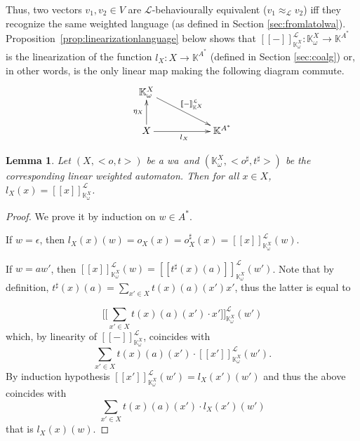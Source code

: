 \documentclass[3p]{elsarticle}
\newcommand{\fL}{\mathcal{L}}    %
\newcommand{\beh}[3]{\left[\!\left[ #1 \right]\!\right]^{#2}_{#3}} %
\newcommand{\Beh}[3]{\Big[\!\!\Big[ #1 \Big]\!\!\Big ]^{#2}_{#3}} %
\newcommand{\K}{\mathbb{K}}            %
\newcommand{\wa}{{\sc wa}}             %
\newtheorem{lemma}{Lemma}
\begin{document}
Thus, two vectors $v_1,v_2\in V$ are $\fL$-behaviourally equivalent ($v_1 \approx_{\fL} v_2$) iff
they recognize the same weighted language (as defined in Section \ref{sec:fromlatolwa}).
Proposition~\ref{prop:linearizationlanguage} below shows that
$\beh{-}{\fL}{\K^X_{\omega}} \colon \K^X_{\omega} \to \K^{A^*}$ is
the linearization of the function $l_X \colon X \to \K^{A^*}$
(defined in Section \ref{sec:coalg}) or, in other words, is the only
linear map making the following diagram commute.
\[
\xymatrix{\K_{\omega}^X \ar[rrd]^{\beh{-}{\fL}{\K^X}}\\
X \ar[rr]_{l_X} \ar[u]^{\eta_X} & &\K^{A^*}}
\]
\begin{lemma}\label{lemma:lan}
Let $(X,<o,t>)$ be a \wa\ and $(\K^X_{\omega},
<o^{\sharp},t^{\sharp}>)$ be the corresponding linear weighted
automaton. Then for all $ x \in X$,
$l_X(x)=\beh{x}{\fL}{\K^X_{\omega}}$.
\end{lemma}
\begin{proof}
We prove it by induction on $w\in A^*$.

If $w=\epsilon$, then
$l_X(x)(w)=o_X(x)=o_X^{\sharp}(x)=\beh{x}{\fL}{\K^X_{\omega}}(w)$.

If $w=aw'$, then
$\beh{x}{\fL}{\K^X_{\omega}}(w)=\beh{t^{\sharp}(x)(a)}{\fL}{\K^X_{\omega}}(w')$.
Note that by definition, $t^{\sharp}(x)(a)=\sum_{x'\in
X}t(x)(a)(x')x'$, thus the latter is equal to


%




$$\Beh{\sum_{x'\in X}t(x)(a)(x')\cdot x'}{\fL}{\K^X_{\omega}}(w')$$
%
which, by linearity of $\beh{-}{\fL}{\K^X_{\omega}}$, coincides with
%
$$\sum_{x'\in X}t(x)(a)(x')\cdot \beh{x'}{\fL}{\K^X_{\omega}}(w')\text{.}$$
%
By induction hypothesis
$\beh{x'}{\fL}{\K^X_{\omega}}(w')=l_X(x')(w')$ and thus the above
coincides with
$$\sum_{x'\in X}t(x)(a)(x')\cdot l_X(x')(w')$$
that is $l_X(x)(w)$.
\end{proof}
\end{document}
